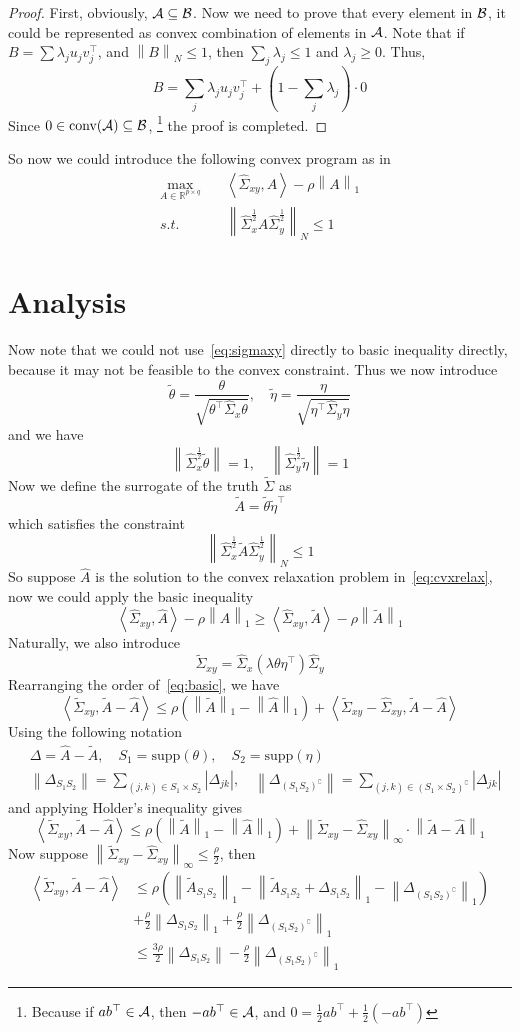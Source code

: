 \documentclass[12pt]{article}
\newcommand{\lam}{\lambda}
\newcommand{\R}{\mathbb R}
\newcommand{\calA}{{\cal A}}
\newcommand{\calB}{{\cal B}}
\newcommand{\com}{^\complement}
\newcommand{\tp}{^\top}
\newcommand{\bra}[1]{\left(#1\right)}
\newcommand{\abs}[1]{\left|#1\right|}
\newcommand{\innprod}[1]{\left\langle#1\right\rangle}
\newcommand{\norm}[1]{\left\|#1\right\|}
\newcommand{\wh}[1]{\widehat{#1}}
\newcommand{\wt}[1]{\widetilde{#1}}
\newcommand{\srt}{^{\frac{1}{2}}}
\def\beq{\begin{equation}}
\def\eeq{\end{equation}}
\def\beqal{\begin{equation}\begin{aligned}}
\def\eeqal{\end{aligned}\end{equation}}
\newcommand{\supp}{\text{supp}}
\begin{document}
\begin{proof}
First, obviously, $\calA\subseteq\calB$. Now we need to prove that every element in $\calB$, it could be represented as convex combination of elements in $\calA$. Note that if $B=\sum\lam_ju_jv_j\tp$, and $\norm{B}_N\leq 1$, then $\sum_j\lam_j\leq 1$ and $\lam_j\geq 0$. Thus,
\beq
B=\sum_j \lam_ju_jv_j\tp+\bra{1-\sum_j \lam_j}\cdot 0
\eeq
Since $0\in\text{conv}(\calA)\subseteq \calB$, \footnote{Because if $ab\tp\in\calA$, then $-ab\tp\in\calA$, and $0=\frac{1}{2}ab\tp +\frac{1}{2}\bra{-ab\tp}$} the proof is completed.
\end{proof}
So now we could introduce the following convex program as in~\cite{gao2014sparse}
\beqal\label{eq:cvxrelax}
\max_{A\in\R^{p\times q}}\quad &\innprod{\wh{\Sigma}_{xy}, A}-\rho \norm{A}_1\\
s.t.\quad &\norm{\wh{\Sigma}_x\srt A\wh{\Sigma}_y\srt}_N\leq 1
\eeqal
\section{Analysis}
Now note that we could not use~\ref{eq:sigmaxy} directly to basic inequality directly, because it may not be feasible to the convex constraint. Thus we now introduce
\beq
\wt{\theta}=\frac{\theta}{\sqrt{\theta\tp\wh{\Sigma}_x\theta}},\quad \wt{\eta}=\frac{\eta}{\sqrt{\eta\tp\wh{\Sigma}_y\eta}}
\eeq
and we have
\beq
\norm{\wh{\Sigma}_x\srt \wt{\theta}}=1,\quad \norm{\wh{\Sigma}_y\srt \wt{\eta}}=1
\eeq
Now we define the surrogate of the truth $\wt{\Sigma}$ as
\beq\label{eq:Atilde}
\wt{A}=\wt{\theta}\wt{\eta}\tp
\eeq
which satisfies the constraint
\beq
\norm{\wh{\Sigma}_x\srt \wt{A}\wh{\Sigma}_y\srt}_N\leq 1
\eeq
So suppose $\wh{A}$ is the solution to the convex relaxation problem in~\ref{eq:cvxrelax},
 now we could apply the basic inequality
\beq\label{eq:basic}
\innprod{\wh{\Sigma}_{xy}, \wh{A}}-\rho \norm{\wh{A}}_1\geq \innprod{\wh{\Sigma}_{xy}, \wt{A}}-\rho\norm{\wt{A}}_1
\eeq
Naturally, we also introduce
\beq
\wt{\Sigma}_{xy}=\wh{\Sigma}_x(\lam\theta \eta\tp)\wh{\Sigma}_y
\eeq
Rearranging the order of~\ref{eq:basic}, we have
\beq
\innprod{\wt{\Sigma}_{xy}, \wt{A}-\wh{A}}\leq \rho \bra{\norm{\wt{A}}_1-\norm{\wh{A}}_1}+\innprod{\wt{\Sigma}_{xy}-\wh{\Sigma}_{xy}, \wt{A}-\wh{A}}
\eeq
Using the following notation
\beqal
&\Delta = \wh{A}-\wt{A},\quad S_1=\text{supp}(\theta),\quad S_2=\supp(\eta)\\
&\norm{\Delta_{S_1S_2}}=\sum_{(j,k)\in S_1\times S_2}\abs{\Delta_{jk}},\quad \norm{\Delta_{(S_1S_2)\com}}=\sum_{(j,k)\in (S_1\times S_2)\com}\abs{\Delta_{jk}}
\eeqal
and applying Holder's inequality gives
\beq
\innprod{\wt{\Sigma}_{xy}, \wt{A}-\wh{A}}\leq \rho \bra{\norm{\wt{A}}_1-\norm{\wh{A}}_1}+\norm{ \wt{\Sigma}_{xy}-\wh{\Sigma}_{xy} }_\infty\cdot \norm{ \wt{A}-\wh{A} }_1
\eeq
Now suppose $\norm{ \wt{\Sigma}_{xy}-\wh{\Sigma}_{xy} }_\infty\leq \frac{\rho}{2}$, then
\beqal\label{eq:anal1}
\innprod{\wt{\Sigma}_{xy}, \wt{A}-\wh{A}}&\leq \rho\bra{\norm{\wt{A}_{S_1S_2}}_1 -\norm{\wt{A}_{S_1S_2} +\Delta_{S_1S_2} }_1- \norm{\Delta_{(S_1S_2)\com}}_1}\\
&+\frac{\rho}{2}\norm{\Delta_{S_1S_2}}_1+\frac{\rho}{2}\norm{\Delta_{(S_1S_2)\com}}_1\\
&\leq \frac{3\rho}{2}\norm{\Delta_{S_1S_2}}-\frac{\rho}{2}\norm{\Delta_{(S_1S_2)\com}}_1
\eeqal
\end{document}
